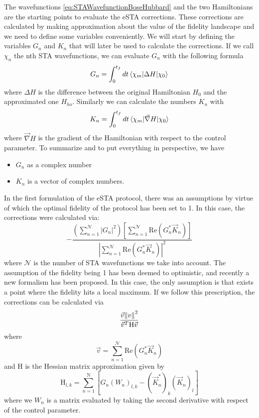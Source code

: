 The wavefunctions \cref{eq:STAWavefunctionBoseHubbard} and the two Hamiltonians are the starting points to evaluate the eSTA corrections.
These corrections are calculated by making approximation about the value of the fidelity landscape and we need to define some variables conveniently.
We will start by defining the variables $G_n$ and $ K_{n} $ that will later be used to calculate the corrections.
If we call $ \chi_{n} $ the nth STA wavefunctions, we can evaluate $ G_n $ with the following formula
\begin{equation}
	G_{n} = \int_{0}^{t_{f}} dt \braket{\chi_{m}|\Delta H |\chi_{0}}
	\label{eq:Gn}
\end{equation}
where $ \Delta H $ is the difference between the original Hamiltonian $ H_{0} $ and the approximated one $ H_{ho} $.
Similarly we can calculate the numbers $ K_{n} $ with
\begin{equation}
	K_{n} = \int_{0}^{t_{f}} dt \braket{\chi_{m}|\vec{\nabla} H|\chi_{0}}
	\label{eq:Kn}
\end{equation}
where $ \vec{\nabla} H$ is the gradient of the Hamiltonian with respect to the control parameter.
To summarize and to put everything in perspective, we have
\begin{itemize}
	\item  $ G_{n} $ as a complex number
	\item  $ K_{n} $ is a vector of complex numbers.
\end{itemize}
In the first formulation of the eSTA protocol, there was an assumptions by virtue of which the optimal fidelity of the protocol has been set to 1.
In this case, the corrections were calculated via:
\begin{equation}
	\label{eq:eSTAcorrections}
	-\frac
	{
	\left( \sum_{n=1}^{\mathcal{N}} |G_{n}|^2 \right)
	\left[ \sum_{n=1}^{\mathcal{N}}\text{Re}(G_{n}^{*}\vec{K}_{n})\right]
	}
	{\left|\sum_{n=1}^{\mathcal{N}}\text{Re}(G_{n}^{*}\vec{K}_{n})\right|^2 }
\end{equation}
where $ \mathcal{N} $ is the number of STA wavefunctions we take into account.
The assumption of the fidelity being 1 has been deemed to optimistic, and recently a new formalism has been proposed.
In this case, the only assumption is that exists a point where the fidelity hits a local maximum.
If we follow this prescription, the corrections can be calculated via
\begin{equation}
	\frac
	{\vec{v}\norm{v}^{2}}
	{\vec{v}^{T}\mathrm{H}\vec{v}}
	\label{eq:eSTAcorrectionsHessian}
\end{equation}
where
\begin{equation}
	\vec{v} = \sum_{n=1}^{\mathcal{N}}\text{Re}(G_{n}^{*}\vec{K}_{n})
	\label{eq:FidelityVector}
\end{equation}
and $ \mathrm{H} $ is the Hessian matrix approximation given by
\begin{equation}
	\mathrm{H}_{l,k} = \sum_{n = 1}^{\mathrm{N}}\left[G_{n}(W_{n})_{l,k} - \left(  \vec{K}^{*}_{n} \right)_{k}\left(  \vec{K}_{n} \right)_{l}\right]
	\label{eq:HessianMatrix}
\end{equation}
where we $ W_{n} $ is a matrix evaluated by taking the second derivative with respect of the control parameter.
